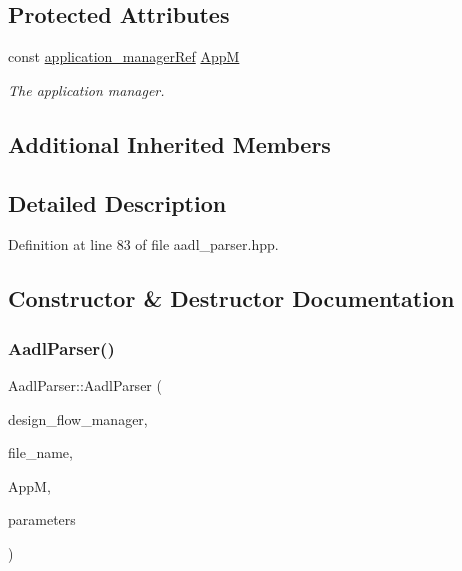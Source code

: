 \subsection*{Protected Attributes}
\begin{DoxyCompactItemize}
\item 
const \hyperlink{application__manager_8hpp_a04ccad4e5ee401e8934306672082c180}{application\+\_\+manager\+Ref} \hyperlink{classAadlParser_a3caa16a2aa1b023109ad23c60ee372d6}{AppM}
\begin{DoxyCompactList}\small\item\em The application manager. \end{DoxyCompactList}\end{DoxyCompactItemize}
\subsection*{Additional Inherited Members}


\subsection{Detailed Description}


Definition at line 83 of file aadl\+\_\+parser.\+hpp.



\subsection{Constructor \& Destructor Documentation}
\mbox{\label{classAadlParser_a7b62919f918da617e84f4bc2bec3f2c0}} 
\subsubsection{\texorpdfstring{Aadl\+Parser()}{AadlParser()}}
{\footnotesize\ttfamily Aadl\+Parser\+::\+Aadl\+Parser (\begin{DoxyParamCaption}\item[{const Design\+Flow\+Manager\+Const\+Ref}]{design\+\_\+flow\+\_\+manager,  }\item[{const std\+::string \&}]{file\+\_\+name,  }\item[{const \hyperlink{application__manager_8hpp_a04ccad4e5ee401e8934306672082c180}{application\+\_\+manager\+Ref}}]{AppM,  }\item[{const \hyperlink{Parameter_8hpp_a37841774a6fcb479b597fdf8955eb4ea}{Parameter\+Const\+Ref}}]{parameters }\end{DoxyParamCaption})}



